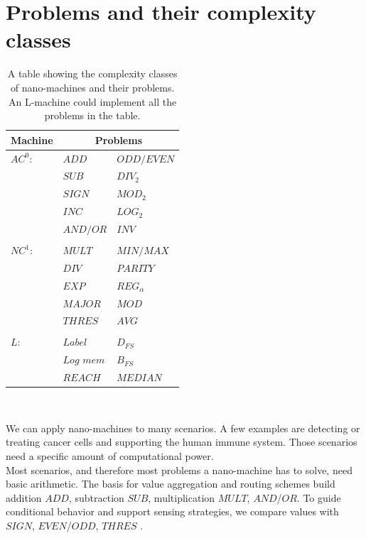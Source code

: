 \documentclass[10pt,sigconf]{acmart}
\begin{document}
\section{Problems and their complexity classes}
\begin{table}[h!]
  \begin{tabular}{ p{1.5cm}|p{2cm} p{2cm}}
    \hline
    Machine & \multicolumn{2}{c}{Problems} \\
    \hline
    $AC^0$: & $ADD$ & $ODD/EVEN$  \\
            & $SUB$ & $DIV_{2}$  \\
            & $SIGN$ & $MOD_{2}$  \\
            & $INC$ & $LOG_{2}$  \\
            & $AND/OR$ & $INV$  \\
            &  &   \\
    $NC^1$:   & $MULT$ &$MIN/MAX$    \\
             & $DIV$ & $PARITY$  \\
             & $EXP$ & $REG_{\alpha}$  \\
             & $MAJOR$ & $MOD$  \\
             & $THRES$ & $AVG$  \\
             &  &   \\
    $L$:      &   $Label$ &$D_{FS}$      \\
             & $Log$ $mem$ & $B_{FS}$  \\
             & $REACH$ & $MEDIAN$  \\
            
    \hline 
  \end{tabular}\\
    
  \caption{A table showing the complexity classes of nano-machines and their problems. An L-machine could implement all the problems in the table.}
  \label{table1}
\end{table}
We can apply nano-machines to many scenarios.
A few examples are detecting or treating cancer cells and supporting the human immune system.
Those scenarios need a specific amount of computational power.\\
Most scenarios, and therefore most problems a nano-machine has to solve, need basic arithmetic.
The basis for value aggregation and routing schemes build addition $ADD$, subtraction $SUB$, multiplication $MULT$, $AND$/$OR$.
To guide conditional behavior and support sensing strategies, we compare values with $SIGN$, $EVEN$/$ODD$, $THRES$ .\\
\end{document}
